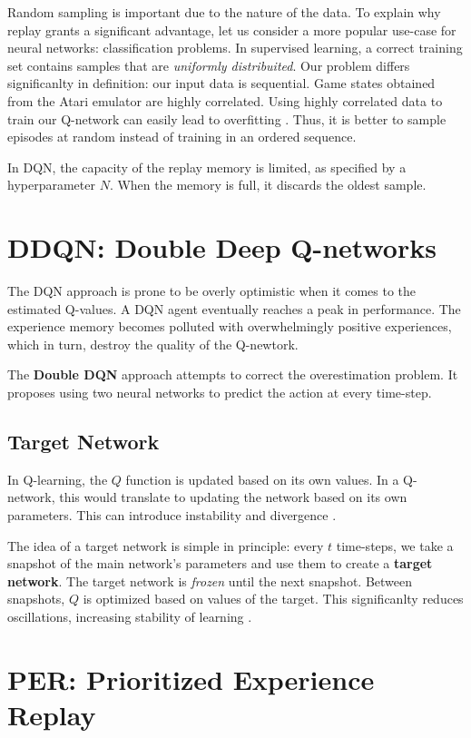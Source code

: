 Random sampling is important due to the nature of the data.
To explain why replay grants a significant advantage, let us consider a more popular use-case for neural networks: classification problems.
In supervised learning, a correct training set contains samples that are \emph{uniformly distribuited}.
Our problem differs significanlty in definition: our input data is sequential.
Game states obtained from the Atari emulator are highly correlated.
Using highly correlated data to train our Q-network can easily lead to overfitting \cite{jaromiru-dqn}.
Thus, it is better to sample episodes at random instead of training in an ordered sequence.

In DQN, the capacity of the replay memory is limited, as specified by a hyperparameter \(N\). When the memory is full, it discards the oldest sample.

\section{DDQN: Double Deep Q-networks}
The DQN approach is prone to be overly optimistic when it comes to the estimated Q-values.
A DQN agent eventually reaches a peak in performance.
The experience memory becomes polluted with overwhelmingly positive experiences, which in turn, destroy the quality of the Q-newtork.

The \textbf{Double DQN} \cite{ddqn-paper} approach attempts to correct the overestimation problem.
It proposes using two neural networks to predict the action at every time-step.

\subsection{Target Network}

In Q-learning, the \(Q\) function is updated based on its own values.
In a Q-network, this would translate to updating the network based on its own parameters. This can introduce instability and divergence \cite{jaromiru-dqn}.

The idea of a target network is simple in principle:
every \(t\) time-steps, we take a snapshot of the main network's parameters and use them to create a \textbf{target network}.
The target network is \emph{frozen} \cite{long-peak-rl} until the next snapshot.
Between snapshots, \(Q\) is optimized based on values of the target.
This significanlty reduces oscillations, increasing stability of learning \cite{atari-dqn}.

\section{PER: Prioritized Experience Replay}

